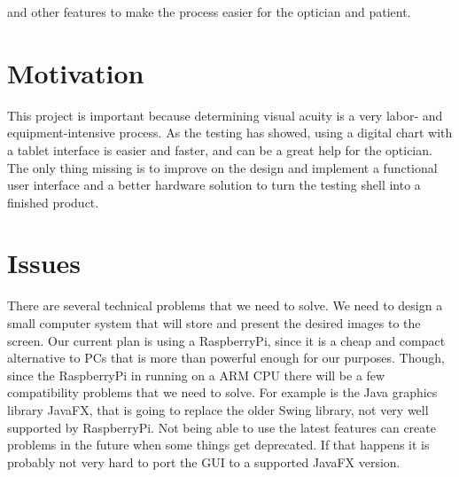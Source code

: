 \documentclass[12pt,a4paper,notitlepage]{report}
\begin{document}
and other features to make the process easier for the optician and patient.




\section{Motivation}

This project is important because determining visual acuity is a very labor- and equipment-intensive process. As the testing has showed, using a digital chart with a tablet interface is easier and faster, and can be a great help for the optician. The only thing missing is to improve on the design and implement a functional user interface and a better hardware solution to turn the testing shell into a finished product. 






\section{Issues} %
There are several technical problems that we need to solve. We need to design a small computer system that will store and present the desired images to the screen. Our current plan is using a RaspberryPi, since it is a cheap and compact alternative to PCs that is more than powerful enough for our purposes. Though, since the RaspberryPi in running on a ARM CPU there will be a few compatibility problems that we need to solve. For example is the Java graphics library JavaFX, that is going to replace the older Swing library, not very well supported by RaspberryPi. Not being able to use the latest features can create problems in the future when some things get deprecated. If that happens it is probably not very hard to port the GUI to a supported JavaFX version.
\end{document}
